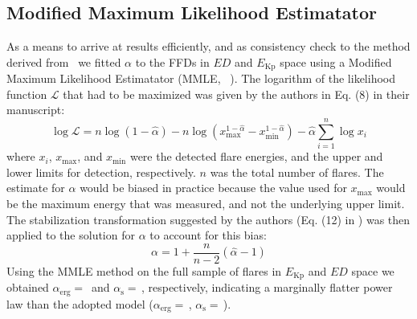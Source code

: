\documentclass{aa}
\begin{document}
\begin{appendix}
\section{Modified Maximum Likelihood Estimatator}
\label{sec:app:MMLE}
As a means to arrive at results efficiently, and as consistency check to the method derived from~\citet{wheatland_flaresbayes_2004} we fitted $\alpha$ to the FFDs in $ED$ and $E_\mathrm{Kp}$ space using a Modified Maximum Likelihood Estimatator (MMLE,~ \citealt{maschberger2009}). The logarithm of the likelihood function $\mathcal{L}$ that had to be maximized was given by the authors in Eq. (8) in their manuscript:
\begin{equation}
\log \mathcal{L} = n \log (1-\hat{\alpha})-n \log\left(x_\mathrm{max}^{1-\hat{\alpha}}-x_\mathrm{min}^{1-\hat{\alpha}}\right) - \hat{\alpha} \displaystyle\sum_{i=1}^{n}\log x_i
\label{eqn:MLE}
\end{equation}
where $x_i$, $x_\mathrm{max}$, and $x_\mathrm{min}$ were the detected flare energies, and the upper and lower limits for detection, respectively. $n$ was the total number of flares. The estimate for $\alpha$ would be biased in practice because the value used for $x_\mathrm{max}$ would be the maximum energy that was measured, and not the underlying upper limit. The stabilization transformation suggested by the authors (Eq. (12) in \citealt{maschberger2009}) was then applied to the solution for $\alpha$ to account for this bias:
\begin{equation}
\alpha = 1 + \dfrac{n}{n-2}(\hat{\alpha} - 1)
\label{eqn:MLE_stabilize}
\end{equation}
Using the MMLE method on the full sample of flares in $E_\mathrm{Kp}$ and $ED$ space we obtained $\alpha_\mathrm{erg}=$\, and $\alpha_\mathrm{s}=$\,\unskip, respectively, indicating a marginally flatter power law than the adopted \citet{wheatland_flaresbayes_2004} model ($\alpha_\mathrm{erg}=$\,, $\alpha_\mathrm{s}=$\,).
\end{appendix}
\end{document}
